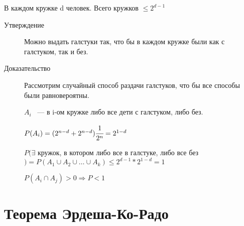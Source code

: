\documentclass[12pt]{article}
\begin{document}
В каждом кружке d человек. Всего кружков $\le 2^{d - 1}$
\begin{description}
\item[Утверждение] Можно выдать галстуки так, что бы в каждом кружке были как с галстуком, так и без.

\item[Доказательство] Рассмотрим случайный способ раздачи галстуков, что бы все способы были равновероятны. 

$A_i$ ~--- в i-ом кружке либо все дети с галстуком, либо без. 

$P(A_i) = (2^{n - d} + 2^{n - d}) \cfrac{1}{2^n} = 2^{1 - d}$

$P(\exists$ кружок, в котором либо все в галстуке, либо все без$) = P(A_1 \cup A_2 \cup \ldots \cup A_k) \le 2^{d - 1} * 2^{1 - d} = 1$

$P(A_i \cap A_j) > 0 \Rightarrow P < 1$ 

\end{description}

\section{Теорема Эрдеша-Ко-Радо}
\end{document}

